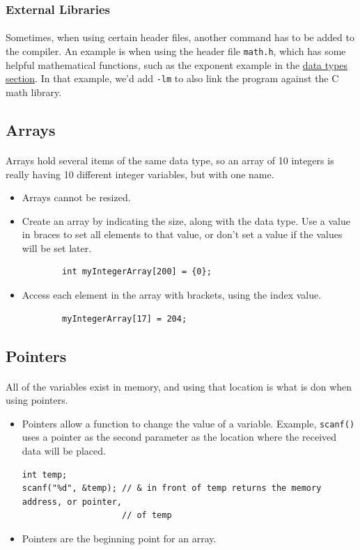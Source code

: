 \documentclass[letter,11pt]{article}
\begin{document}
\subsubsection{External Libraries}
\paragraph{}Sometimes, when using certain header files, another command has to be added to the compiler. An example is when using the header file \texttt{math.h}, which has some helpful mathematical functions, such as the exponent example in the \hyperref[sec:datatypes]{data types section}. In that example, we'd add \texttt{-lm} to also link the program against the C math library.

\subsection{Arrays}
\paragraph{}Arrays hold several items of the same data type, so an array of 10 integers is really having 10 different integer variables, but with one name.
\begin{itemize}
    \item Arrays cannot be resized.
    \item Create an array by indicating the size, along with the data type. Use a value in braces to set all elements to that value, or don't set a value if the values will be set later.
    \begin{verbatim}
        int myIntegerArray[200] = {0};
    \end{verbatim}
    \item Access each element in the array with brackets, using the index value.
    \begin{verbatim}
        myIntegerArray[17] = 204;
    \end{verbatim}
\end{itemize}

\subsection{Pointers}
\paragraph{}All of the variables exist in memory, and using that location is what is don when using pointers.
\begin{itemize}
    \item Pointers allow a function to change the value of a variable. Example, \texttt{scanf()} uses a pointer as the second parameter as the location where the received data will be placed.
    \begin{verbatim}
int temp;
scanf("%d", &temp); // & in front of temp returns the memory address, or pointer,
                    // of temp
    \end{verbatim}
    \item Pointers are the beginning point for an array.
\end{itemize}
\end{document}
